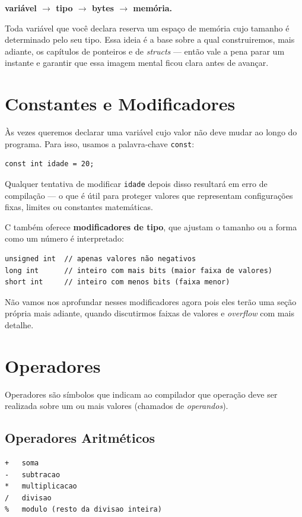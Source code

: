 \documentclass[12pt,a4paper,oneside]{extreport}
\begin{document}
\begin{center}
\textbf{variável $\rightarrow$ tipo $\rightarrow$ bytes $\rightarrow$ memória.}
\end{center}

Toda variável que você declara reserva um espaço de memória cujo tamanho é determinado pelo seu tipo. Essa ideia é a base sobre a qual construiremos, mais adiante, os capítulos de ponteiros e de \textit{structs} — então vale a pena parar um instante e garantir que essa imagem mental ficou clara antes de avançar.

\section{Constantes e Modificadores}
\label{sec:constantes-modificadores}
Às vezes queremos declarar uma variável cujo valor não deve mudar ao longo do programa. Para isso, usamos a palavra-chave \texttt{const}:

\begin{lstlisting}
const int idade = 20;
\end{lstlisting}

Qualquer tentativa de modificar \texttt{idade} depois disso resultará em erro de compilação — o que é útil para proteger valores que representam configurações fixas, limites ou constantes matemáticas.

C também oferece \textbf{modificadores de tipo}, que ajustam o tamanho ou a forma como um número é interpretado:

\begin{lstlisting}
unsigned int  // apenas valores não negativos
long int      // inteiro com mais bits (maior faixa de valores)
short int     // inteiro com menos bits (faixa menor)
\end{lstlisting}

Não vamos nos aprofundar nesses modificadores agora pois eles terão uma seção própria mais adiante, quando discutirmos faixas de valores e \textit{overflow} com mais detalhe.

\section{Operadores}
Operadores são símbolos que indicam ao compilador que operação deve ser realizada sobre um ou mais valores (chamados de \textit{operandos}).

\subsection{Operadores Aritméticos}
\begin{lstlisting}
+   soma
-   subtracao
*   multiplicacao
/   divisao
%   modulo (resto da divisao inteira)
\end{lstlisting}
\end{document}
